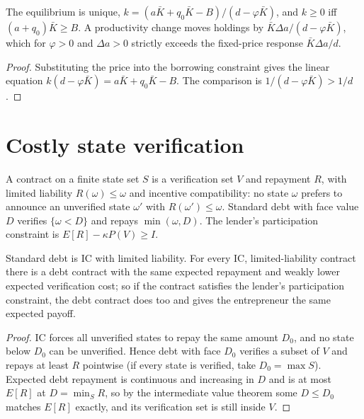 \begin{theorem}[Amplification]
\label{thm:km}
\leanok
{}
The equilibrium is unique, $k=(a\bar K+q_0\bar K-B)/(d-\varphi\bar K)$, and $k\ge0$ iff $(a+q_0)\bar K\ge B$. A
productivity change moves holdings by $\bar K\Delta a/(d-\varphi\bar K)$, which for $\varphi>0$ and $\Delta a>0$
strictly exceeds the fixed-price response $\bar K\Delta a/d$.
\end{theorem}
\begin{proof}
\leanok
Substituting the price into the borrowing constraint gives the linear equation $k(d-\varphi\bar K) = a\bar K+q_0\bar
K-B$. The comparison is $1/(d-\varphi\bar K)>1/d$.
\end{proof}

\section{Costly state verification}

\begin{definition}
\label{def:csv}
\leanok
A contract on a finite state set $S$ is a verification set $V$ and repayment $R$, with limited liability
$R(\omega)\le\omega$ and incentive compatibility: no state $\omega$ prefers to announce an unverified state $\omega'$
with $R(\omega')\le\omega$. Standard debt with face value $D$ verifies $\{\omega<D\}$ and repays $\min(\omega,D)$.
The lender's participation constraint is $E[R]-\kappa P(V)\ge I$.
\end{definition}

\begin{theorem}
\label{thm:csv}
\leanok
{}
Standard debt is IC with limited liability. For every IC, limited-liability contract there is a debt contract with
the same expected repayment and weakly lower expected verification cost; so if the contract satisfies the lender's
participation constraint, the debt contract does too and gives the entrepreneur the same expected payoff.
\end{theorem}
\begin{proof}
\leanok
IC forces all unverified states to repay the same amount $D_0$, and no state below $D_0$ can be unverified. Hence
debt with face $D_0$ verifies a subset of $V$ and repays at least $R$ pointwise (if every state is verified, take
$D_0=\max S$). Expected debt repayment is continuous and increasing in $D$ and is at most $E[R]$ at
$D=\min_S R$, so by the intermediate value theorem some $D\le D_0$ matches $E[R]$ exactly, and its verification
set is still inside $V$.
\end{proof}
